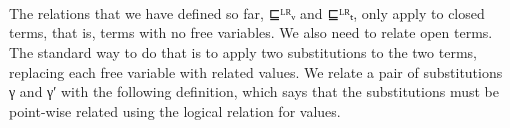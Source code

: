 \begin{code}
\AgdaOperator{\AgdaInductiveConstructor{,}}\AgdaSpace{}%
\AgdaSpace{}%
\AgdaOperator{\AgdaInductiveConstructor{,}}\AgdaSpace{}%
\AgdaSymbol{))}\<%
\\
%
\\[\AgdaEmptyExtraSkip]%
\>[0]\AgdaSpace{}%
\AgdaSymbol{:}\AgdaSpace{}%
\AgdaSpace{}%
\AgdaSpace{}%
\AgdaSpace{}%
\AgdaSpace{}%
\AgdaSpace{}%
\AgdaSymbol{\}}\AgdaSpace{}%
\AgdaSpace{}%
\AgdaSpace{}%
\AgdaSpace{}%
\AgdaSpace{}%
\AgdaSpace{}%
\<%
\\
\>[0]\AgdaSpace{}%
\AgdaSpace{}%
\AgdaSpace{}%
\AgdaSpace{}%
\AgdaSpace{}%
\AgdaSymbol{=}\AgdaSpace{}%
\AgdaSymbol{(}\AgdaSpace{}%
\AgdaSpace{}%
\AgdaSpace{}%
\AgdaSpace{}%
\AgdaSpace{}%
\AgdaSpace{}%
\AgdaSymbol{)}\AgdaSpace{}%
\AgdaSpace{}%
\AgdaSymbol{(}\AgdaSpace{}%
\AgdaSpace{}%
\AgdaSpace{}%
\AgdaSpace{}%
\AgdaSpace{}%
\AgdaSpace{}%
\AgdaSymbol{)}\<%
\end{code}

The relations that we have defined so far, ⊑ᴸᴿᵥ and ⊑ᴸᴿₜ, only apply
to closed terms, that is, terms with no free variables.  We also need
to relate open terms. The standard way to do that is to apply two
substitutions to the two terms, replacing each free variable with
related values. We relate a pair of substitutions γ and γ′ with the
following definition, which says that the substitutions must be
point-wise related using the logical relation for values.

